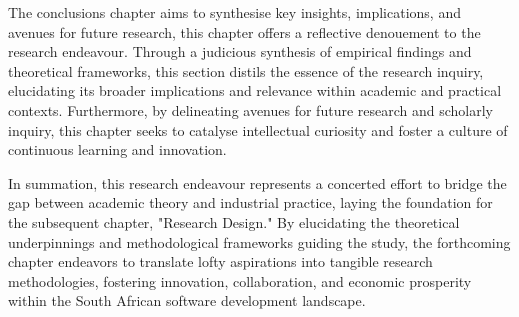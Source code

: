 \par{The conclusions chapter aims to synthesise key insights, implications, and avenues for future research, this 
chapter offers a reflective denouement to the research endeavour. Through a judicious synthesis of empirical findings and 
theoretical frameworks, this section distils the essence of the research inquiry, elucidating its broader implications and 
relevance within academic and practical contexts. Furthermore, by delineating avenues for future research and scholarly 
inquiry, this chapter seeks to catalyse intellectual curiosity and foster a culture of continuous learning and innovation.}
\par{In summation, this research endeavour represents a concerted effort to bridge the gap between academic theory and 
industrial practice, laying the foundation for the subsequent chapter, "Research Design." By elucidating the theoretical 
underpinnings and methodological frameworks guiding the study, the forthcoming chapter endeavors to translate lofty 
aspirations into tangible research methodologies, fostering innovation, collaboration, and economic prosperity within 
the South African software development landscape.}